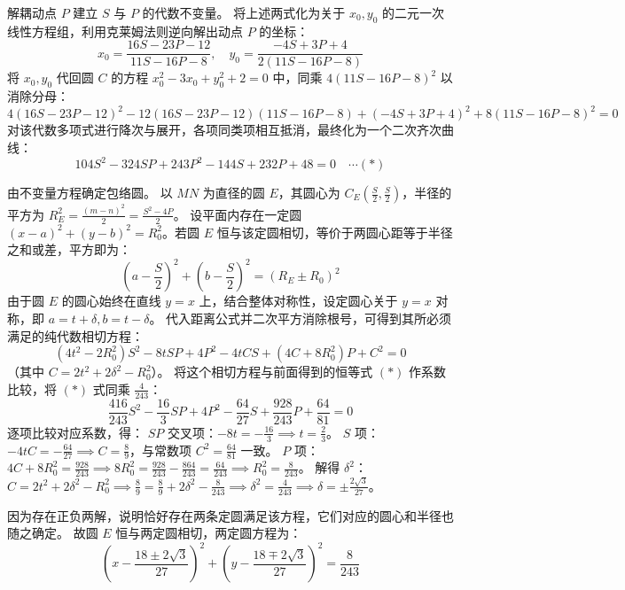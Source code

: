 \begin{solution}
解耦动点 $P$ 建立 $S$ 与 $P$ 的代数不变量。
将上述两式化为关于 $x_0, y_0$ 的二元一次线性方程组，利用克莱姆法则逆向解出动点 $P$ 的坐标：
$$ x_0 = \frac{16S - 23P - 12}{11S - 16P - 8}, \quad y_0 = \frac{-4S + 3P + 4}{2(11S - 16P - 8)} $$
将 $x_0, y_0$ 代回圆 $C$ 的方程 $x_0^2 - 3x_0 + y_0^2 + 2 = 0$ 中，同乘 $4(11S - 16P - 8)^2$ 以消除分母：
$$ 4(16S - 23P - 12)^2 - 12(16S - 23P - 12)(11S - 16P - 8) + (-4S + 3P + 4)^2 + 8(11S - 16P - 8)^2 = 0 $$
对该代数多项式进行降次与展开，各项同类项相互抵消，最终化为一个二次齐次曲线：
$$ 104 S^2 - 324 SP + 243 P^2 - 144 S + 232 P + 48 = 0 \quad \cdots (*) $$

由不变量方程确定包络圆。
以 $MN$ 为直径的圆 $E$，其圆心为 $C_E(\frac{S}{2}, \frac{S}{2})$，半径的平方为 $R_E^2 = \frac{(m-n)^2}{2} = \frac{S^2 - 4P}{2}$。
设平面内存在一定圆 $(x - a)^2 + (y - b)^2 = R_0^2$。若圆 $E$ 恒与该定圆相切，等价于两圆心距等于半径之和或差，平方即为：
$$ (a - \frac{S}{2})^2 + (b - \frac{S}{2})^2 = (R_E \pm R_0)^2 $$
由于圆 $E$ 的圆心始终在直线 $y=x$ 上，结合整体对称性，设定圆心关于 $y=x$ 对称，即 $a = t + \delta, b = t - \delta$。
代入距离公式并二次平方消除根号，可得到其所必须满足的纯代数相切方程：
$$ (4t^2 - 2 R_0^2) S^2 - 8t SP + 4 P^2 - 4t C S + (4C + 8 R_0^2) P + C^2 = 0 $$
（其中 $C = 2t^2 + 2\delta^2 - R_0^2$）。
将这个相切方程与前面得到的恒等式 $(*)$ 作系数比较，将 $(*)$ 式同乘 $\frac{4}{243}$：
$$ \frac{416}{243} S^2 - \frac{16}{3} SP + 4 P^2 - \frac{64}{27} S + \frac{928}{243} P + \frac{64}{81} = 0 $$
逐项比较对应系数，得：
$SP$ 交叉项：$-8t = -\frac{16}{3} \implies t = \frac{2}{3}$。
$S$ 项：$-4t C = -\frac{64}{27} \implies C = \frac{8}{9}$，与常数项 $C^2 = \frac{64}{81}$ 一致。
$P$ 项：$4C + 8 R_0^2 = \frac{928}{243} \implies 8 R_0^2 = \frac{928}{243} - \frac{864}{243} = \frac{64}{243} \implies R_0^2 = \frac{8}{243}$。
解得 $\delta^2$：$C = 2t^2 + 2\delta^2 - R_0^2 \implies \frac{8}{9} = \frac{8}{9} + 2\delta^2 - \frac{8}{243} \implies \delta^2 = \frac{4}{243} \implies \delta = \pm \frac{2\sqrt{3}}{27}$。

因为存在正负两解，说明恰好存在两条定圆满足该方程，它们对应的圆心和半径也随之确定。
故圆 $E$ 恒与两定圆相切，两定圆方程为：
$$ \left(x - \frac{18 \pm 2\sqrt{3}}{27}\right)^2 + \left(y - \frac{18 \mp 2\sqrt{3}}{27}\right)^2 = \frac{8}{243} $$
\end{solution}

